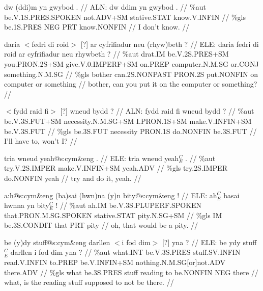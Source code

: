 \documentclass[a4paper,10pt]{article}
\begin{document}
\ex
\begingl[lingstyle=gergl]
\glchat dw (ddi)m yn gwybod . //
\glsurface ALN:  dw ddim yn gwybod .  //
\glauto \%aut  be{\scriptsize .V.1S.PRES.SPOKEN} not{\scriptsize .ADV+SM} stative{\scriptsize .STAT} know{\scriptsize .V.INFIN}   //
\glmanual \%gls  be{\scriptsize .1S.PRES} NEG PRT know{\scriptsize .NONFIN}   //
\gleng I don't know. //
\endgl
\xe

\ex
\begingl[lingstyle=gergl]
\glchat daria $<$fedri di roid$>$ [?] ar cyfrifiadur neu (rhyw)beth ? //
\glsurface ELE:  daria fedri di roid ar cyfrifiadur neu rhywbeth ?  //
\glauto \%aut  drat{\scriptsize .IM} be{\scriptsize .V.2S.PRES+SM} you{\scriptsize .PRON.2S+SM} give{\scriptsize .V.0.IMPERF+SM} on{\scriptsize .PREP} computer{\scriptsize .N.M.SG} or{\scriptsize .CONJ} something{\scriptsize .N.M.SG}   //
\glmanual \%gls  bother can{\scriptsize .2S.NONPAST} PRON{\scriptsize .2S} put{\scriptsize .NONFIN} on computer or something   //
\gleng bother, can you put it on the computer or something? //
\endgl
\xe

\ex
\begingl[lingstyle=gergl]
\glchat $<$fydd raid fi$>$ [?] wneud bydd ? //
\glsurface ALN:  fydd raid fi wneud bydd ?  //
\glauto \%aut  be{\scriptsize .V.3S.FUT+SM} necessity{\scriptsize .N.M.SG+SM} I{\scriptsize .PRON.1S+SM} make{\scriptsize .V.INFIN+SM} be{\scriptsize .V.3S.FUT}   //
\glmanual \%gls  be{\scriptsize .3S.FUT} necessity PRON{\scriptsize .1S} do{\scriptsize .NONFIN} be{\scriptsize .3S.FUT}   //
\gleng I'll have to, won't I? //
\endgl
\xe

\ex
\begingl[lingstyle=gergl]
\glchat tria wneud yeah@s:cym\&eng . //
\glsurface ELE:  tria wneud yeah$^{C}_{E}$ .  //
\glauto \%aut  try{\scriptsize .V.2S.IMPER} make{\scriptsize .V.INFIN+SM} yeah{\scriptsize .ADV}   //
\glmanual \%gls  try{\scriptsize .2S.IMPER} do{\scriptsize .NONFIN} yeah   //
\gleng try and do it, yeah. //
\endgl
\xe

\ex
\begingl[lingstyle=gergl]
\glchat a:h@s:cym\&eng (ba)sai (hwn)na (y)n bity@s:cym\&eng ! //
\glsurface ELE:  ah$^{C}_{E}$ basai hwnna yn bity$^{C}_{E}$ !  //
\glauto \%aut  ah{\scriptsize .IM} be{\scriptsize .V.3S.PLUPERF.SPOKEN} that{\scriptsize .PRON.M.SG.SPOKEN} stative{\scriptsize .STAT} pity{\scriptsize .N.SG+SM}   //
\glmanual \%gls  IM be{\scriptsize .3S.CONDIT} that PRT pity   //
\gleng oh, that would be a pity. //
\endgl
\xe

\ex
\begingl[lingstyle=gergl]
\glchat be (y)dy stuff@s:cym\&eng darllen $<$i fod dim$>$ [?] yna ? //
\glsurface ELE:  be ydy stuff$^{C}_{E}$ darllen i fod dim yna ?  //
\glauto \%aut  what{\scriptsize .INT} be{\scriptsize .V.3S.PRES} stuff{\scriptsize .SV.INFIN} read{\scriptsize .V.INFIN} to{\scriptsize .PREP} be{\scriptsize .V.INFIN+SM} nothing{\scriptsize .N.M.SG[or]not.ADV} there{\scriptsize .ADV}   //
\glmanual \%gls  what be{\scriptsize .3S.PRES} stuff reading to be{\scriptsize .NONFIN} NEG there   //
\gleng what, is the reading stuff supposed to not be there. //
\endgl
\xe
\end{document}
